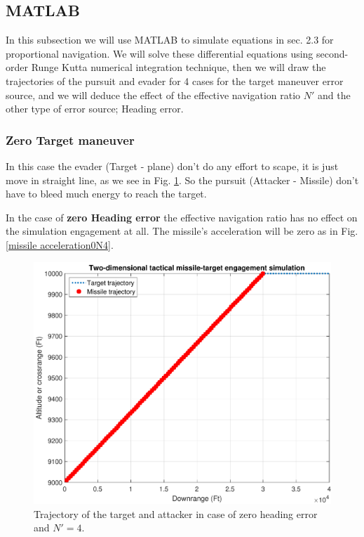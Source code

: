 \subsection{MATLAB}
In this subsection we will use MATLAB to simulate equations in sec. 2.3 for proportional navigation. We will solve these differential equations using second-order Runge Kutta numerical integration technique, then we will draw the trajectories of the pursuit and evader for 4 cases for the target maneuver error source, and we will deduce the effect of the effective navigation ratio $N'$ and the other type of error source; Heading error. 
\subsubsection{Zero Target maneuver}
In this case the evader (Target - plane) don't do any effort to scape, it is just move in straight line, as we see in Fig. \ref{trajectory0N4}. So the pursuit (Attacker - Missile) don't have to bleed much energy to reach the target.

In the case of \textbf{zero Heading error} the effective navigation ratio has no effect on the simulation engagement at all. The missile's acceleration will be zero as in Fig. \ref{missile acceleration0N4}.

\begin{figure}[htb]
	\centering
	\includegraphics[scale = 0.75]{fig/trajectory0N4.pdf}
	\caption{Trajectory of the target and attacker in case of zero heading error and $N'=4$.}
	\label{trajectory0N4}
\end{figure}


